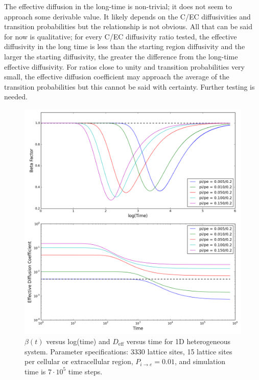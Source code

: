 	The effective diffusion in the long-time is non-trivial; it does not seem to approach some derivable value. It likely depends on the C/EC diffusivities and transition probabilities but the relationship is not obvious. All that can be said for now is qualitative; for every C/EC diffusivity ratio tested, the effective diffusivity in the long time is less than the starting region diffusivity and the larger the starting diffusivity, the greater the difference from the long-time effective diffusivity. For ratios close to unity and transition probabilities very small, the effective diffusion coefficient may approach the average of the transition probabilities but this cannot be said with certainty. Further testing is needed.
	
	\begin{figure}[h!]
		\centering
		\includegraphics[width=1.0\linewidth]{../images/1D/pipe_beta_deff_1D}
		\caption{$ \beta (t) $ versus log(time) and $ D_\textrm{eff} $ versus time for 1D heterogeneous system. Parameter specifications: 3330 lattice sites, 15 lattice sites per cellular or extracellular region, $ P_{i \rightarrow e} = 0.01 $, and simulation time is $ 7\cdot 10^5 $ time steps.}
		\label{fig:pipe_beta_deff_1D}
	\end{figure}

\clearpage
